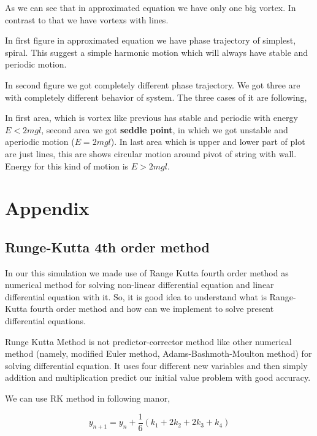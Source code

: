 \documentclass{article}
\begin{document}
As we can see that in approximated equation we have only one big vortex. In contrast to that we have vortexs with lines.

In first figure in approximated equation we have phase trajectory of simplest, spiral. This suggest a simple harmonic motion which will always have stable and periodic motion.

In second figure we got completely different phase trajectory. We got three are with completely different behavior of system. The three cases of it are following,

In first area, which is vortex like previous has stable and periodic with energy \(E<2mgl\), second area we got \textbf{seddle point}, in which we got unstable and aperiodic motion (\(E=2mgl\)). In last area which is upper and lower part of plot are just lines, this are shows circular motion around pivot of string with wall. Energy for this kind of motion is \(E>2mgl\).




\pagebreak



\section{Appendix}
\label{sec:orgdf11517}

\subsection{Runge-Kutta 4th order method}
\label{sec:org405d12c}

In our this simulation we made use of Range Kutta fourth order method as numerical method for solving non-linear differential equation and linear differential equation with it. So, it is good idea to understand what is Range-Kutta fourth order method and how can we implement to solve present differential equations.

Runge Kutta Method is not predictor-corrector method like other numerical method (namely, modified Euler method, Adams-Bashmoth-Moulton method) for solving differential equation. It uses four different new variables and then simply addition and multiplication predict our initial value problem with good accuracy.

We can use RK method in following manor,

\begin{equation*}
y_{n+1} = y_{n}+\frac{1}{6}(k_{1}+2k_{2}+2k_{3}+k_{4})
\end{equation*}
\end{document}
